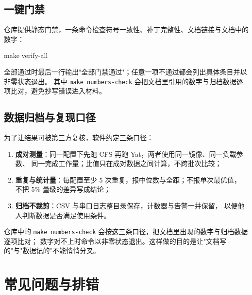 \documentclass[11pt,a4paper]{article}
\newcommand{\code}[1]{\texttt{#1}}
\newenvironment{shell}{\Verbatim[fontsize=\small,frame=single,framesep=4pt]}{\endVerbatim}
\begin{document}
\subsection{一键门禁}

仓库提供静态门禁，一条命令检查符号一致性、补丁完整性、文档链接与文档中的数字：

\begin{shell}
make verify-all
\end{shell}

全部通过时最后一行输出"全部门禁通过"；任意一项不通过都会列出具体条目并以非零状态退出。
其中 \code{make numbers-check} 会把文档里引用的数字与归档数据逐项比对，避免抄写错误进入材料。
\subsection{数据归档与复现口径}

为了让结果可被第三方复核，软件约定三条口径：

\begin{enumerate}
  \item \textbf{成对测量}：同一配置下先跑 CFS 再跑 Yat，两者使用同一镜像、同一负载参数、
        同一完成工作量；比值只在成对数据之间计算，不跨批次比较；
  \item \textbf{重复与统计量}：每配置至少 5 次重复，报中位数与全距；不报单次最优值，
        不把 5\% 量级的差异写成结论；
  \item \textbf{归档不裁剪}：CSV 与串口日志整目录保存，计数器与告警一并保留，
        以便他人判断数据是否满足使用条件。
\end{enumerate}

仓库中的 \code{make numbers-check} 会按这三条口径，把文档里出现的数字与归档数据逐项比对；
数字对不上时命令以非零状态退出。这样做的目的是让"文档写的"与"数据记的"不能悄悄分叉。

\section{常见问题与排错}
\end{document}
